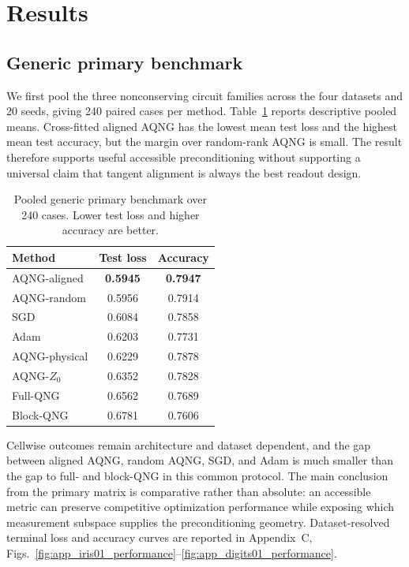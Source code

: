\section{Results}

\subsection{Generic primary benchmark}
We first pool the three nonconserving circuit families across the four datasets and 20 seeds, giving 240 paired cases per method. Table~\ref{tab:generic} reports descriptive pooled means. Cross-fitted aligned AQNG has the lowest mean test loss and the highest mean test accuracy, but the margin over random-rank AQNG is small. The result therefore supports useful accessible preconditioning without supporting a universal claim that tangent alignment is always the best readout design.

\begin{table}[t]
\centering
\caption{Pooled generic primary benchmark over 240 cases. Lower test loss and higher accuracy are better.}
\label{tab:generic}
\begin{tabular}{lcc}
\toprule
Method & Test loss & Accuracy \\
\midrule
AQNG-aligned  & \textbf{0.5945} & \textbf{0.7947} \\
AQNG-random   & 0.5956 & 0.7914 \\
SGD           & 0.6084 & 0.7858 \\
Adam          & 0.6203 & 0.7731 \\
AQNG-physical & 0.6229 & 0.7878 \\
AQNG-$Z_0$    & 0.6352 & 0.7828 \\
Full-QNG      & 0.6562 & 0.7689 \\
Block-QNG     & 0.6781 & 0.7606 \\
\bottomrule
\end{tabular}
\end{table}

Cellwise outcomes remain architecture and dataset dependent, and the gap between aligned AQNG, random AQNG, SGD, and Adam is much smaller than the gap to full- and block-QNG in this common protocol. The main conclusion from the primary matrix is comparative rather than absolute: an accessible metric can preserve competitive optimization performance while exposing which measurement subspace supplies the preconditioning geometry. Dataset-resolved terminal loss and accuracy curves are reported in Appendix~C, Figs.~\ref{fig:app_iris01_performance}--\ref{fig:app_digits01_performance}.

